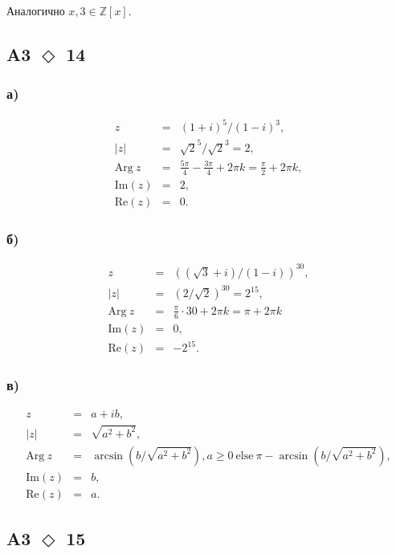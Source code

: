 \documentclass[a4paper]{article}
\renewcommand{\Re}[1]{\mathrm{Re}\left(#1\right)}
\renewcommand{\Im}[1]{\mathrm{Im}\left(#1\right)}
\newcommand{\task}[2]{A#1 $\Diamond$ #2}
\begin{document}
  Аналогично $x, 3 \in \mathbb{Z}\left[x\right]$.

  \subsection*{\task{3}{14}}
  \subsubsection*{а)}
  \begin{eqnarray*}
        z &=& (1 + i)^5/(1 - i)^3,\\
        |z|&=&\sqrt{2}^5 / \sqrt{2}^3 = 2,\\
        \mathrm{Arg}\:z &=& \frac{5\pi}{4} - \frac{3\pi}{4} + 2 \pi k = \frac{\pi}{2} + 2 \pi k,\\
        \Im{z} &=& 2,\\
        \Re{z} &=& 0.
  \end{eqnarray*}

  \subsubsection*{б)}
  \begin{eqnarray*}
        z &=& \left((\sqrt{3} + i)/(1 - i)\right)^{30},\\
        |z|&=& (2/\sqrt{2})^{30} = 2^{15},\\
        \mathrm{Arg}\:z &=& \frac{\pi}{6}\cdot 30 + 2\pi k = \pi + 2\pi k\\
        \Im{z} &=& 0,\\
        \Re{z} &=& -2^{15}.
  \end{eqnarray*}

  \subsubsection*{в)}
  \begin{eqnarray*}
        z &=& a + ib,\\
        |z|&=&\sqrt{a^2 + b^2},\\
        \mathrm{Arg}\:z &=& \arcsin\left(b/\sqrt{a^2 + b^2}\right), a\ge0\:\mathrm{else}\: \pi - \arcsin \left(b/\sqrt{a^2 + b^2}\right),\\
        \Im{z} &=& b,\\
        \Re{z} &=& a.
  \end{eqnarray*}

  \subsection*{\task{3}{15}}
\end{document}
